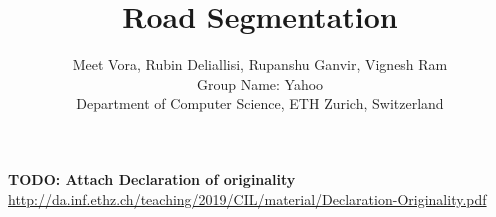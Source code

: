 \documentclass[10pt,conference,compsocconf]{IEEEtran}
\begin{document}
\title{Road Segmentation}

\author{
  Meet Vora, Rubin Deliallisi, Rupanshu Ganvir, Vignesh Ram \\
  Group Name: Yahoo \\
  Department of Computer Science, ETH Zurich, Switzerland
}

\maketitle

\begin{abstract}
\end{abstract}








\textbf{TODO: Attach Declaration of originality}
\url{http://da.inf.ethz.ch/teaching/2019/CIL/material/Declaration-Originality.pdf}




\end{document}
